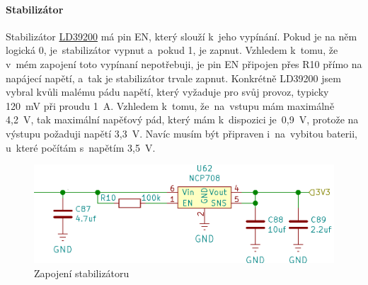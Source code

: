 \paragraph*{Stabilizátor}

Stabilizátor \href{https://datasheet.lcsc.com/szlcsc/1808280153_STMicroelectronics-LD39200PU33R_C222192.pdf}{LD39200} \parencite{stabl} má pin EN, který slouží k~je\-ho vypínání. 
Pokud je na něm logická 0, je~stabilizátor vypnut a~pokud 1, je zapnut. Vzhledem k~tomu, že v~mém zapojení toto vypínaní nepotřebuji, je pin EN připojen 
přes R10 přímo na napájecí napětí, a~tak je stabilizátor trvale zapnut.
Konkrétně LD39200 jsem vybral kvůli malému pádu napětí, který vyžaduje pro svůj provoz, typicky 120~mV při proudu 1~A. Vzhledem k~tomu, že~na~vstupu 
mám maximálně 4,2~V, tak maximální napěťový pád, který mám k~dispozici je~0,9~V, protože na výstupu požaduji napětí 3,3~V. Navíc musím být připraven
i~na~vybitou baterii, u~které počítám s~napětím 3,5~V. %

\begin{figure}[htbp]
    \centering
    \includegraphics[width=400pt]{kapitoly/obrazky/E4/napajeni/stabilizator.png}
    \caption{Zapojení stabilizátoru}
    \label{fig:E4-stabilizator}
\end{figure}



